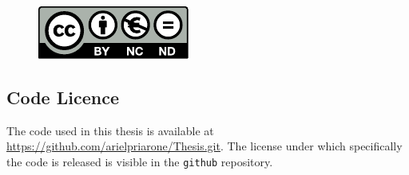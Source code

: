\begin{figure}
    \centering
    \includegraphics{images/CreativeCommons/by-nc-nd.eu.pdf}
\end{figure}

\subsection{Code Licence}
The code used in this thesis is available at \url{https://github.com/arielpriarone/Thesis.git}. The license under which specifically the code is released is visible in the \texttt{github} repository.
